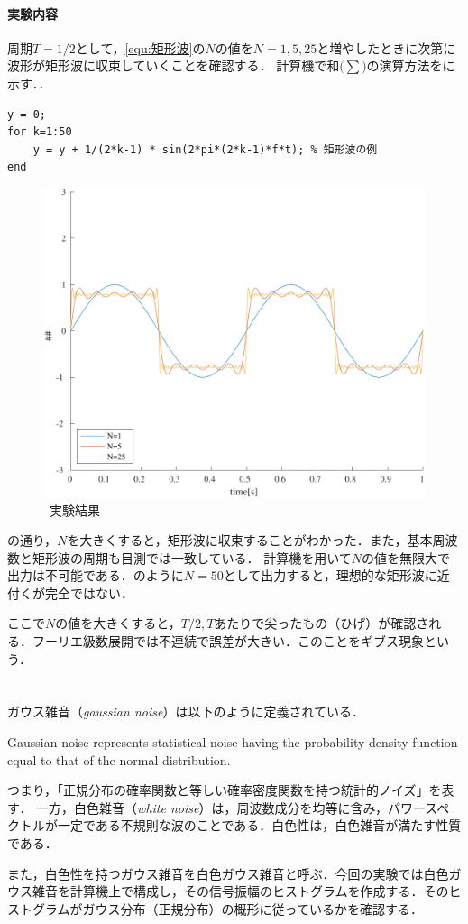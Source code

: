 \paragraph{実験内容}周期\(T=1/2\)として，\eqref{equ:矩形波}の\(N\)の値を\(N=1, 5, 25\)と増やしたときに次第に波形が矩形波に収束していくことを確認する．
計算機で和\(\big(\sum\big)\)の演算方法をに示す．\scall{}．
\begin{lstlisting}[caption={和の演算},label={src:和の演算},numbers={none}]
y = 0;
for k=1:50
    y = y + 1/(2*k-1) * sin(2*pi*(2*k-1)*f*t); % 矩形波の例
end
\end{lstlisting}
\result
\begin{figure}
    \centering
    \vspace{-2cm}
    \includegraphics[keepaspectratio,width=.3\textwidth]{../../Figures/01_04_2.pdf}
    \caption{\kadaiad\ 実験結果}
    \label{fig:\kadaiae_実験結果}
    \vspace{-2cm}
\end{figure}
の通り，\(N\)を大きくすると，矩形波に収束することがわかった．また，基本周波数と矩形波の周期も目測では一致している．
\consideration
計算機を用いて\(N\)の値を無限大で出力は不可能である．のように\(N=50\)として出力すると，理想的な矩形波に近付くが完全ではない．\par
ここで\(N\)の値を大きくすると，\(T/2, T\)あたりで尖ったもの（ひげ）が確認される．フーリエ級数展開では不連続で誤差が大きい．このことをギブス現象という．\cite[p.34]{信号処理}
\section{\kadaiae}\label{sec:\kadaiae}
\purpose
ガウス雑音（\textit{gaussian noise}）は以下のように定義されている．
\begin{leftbar}
    Gaussian noise represents statistical noise having the probability density function equal to that of the normal distribution.
    \hfill\cite{barbu2013variational}
\end{leftbar}
つまり，「正規分布の確率関数と等しい確率密度関数を持つ統計的ノイズ」を表す．
一方，白色雑音（\textit{white noise}）は，周波数成分を均等に含み，パワースペクトルが一定である不規則な波のことである\cite{witenoise}．白色性は，白色雑音が満たす性質である．\par
また，白色性を持つガウス雑音を白色ガウス雑音と呼ぶ．今回の実験では白色ガウス雑音を計算機上で構成し，その信号振幅のヒストグラムを作成する．そのヒストグラムがガウス分布（正規分布）の概形に従っているかを確認する．

